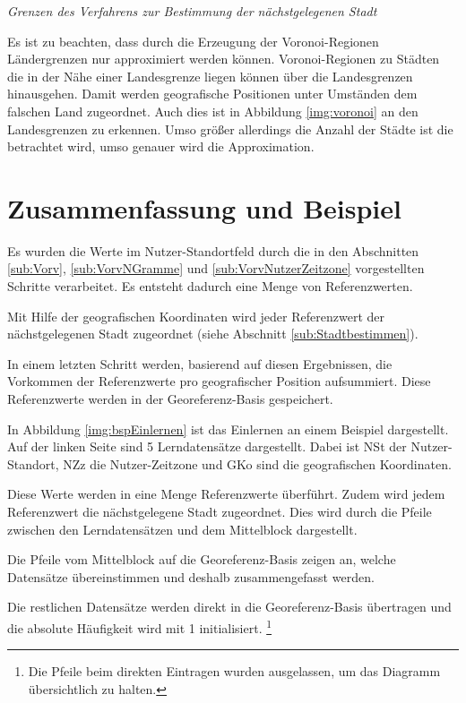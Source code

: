 			\textit{Grenzen des Verfahrens zur Bestimmung der nächstgelegenen Stadt}

				Es ist zu beachten, dass durch die Erzeugung der Voronoi-Regionen Ländergrenzen nur approximiert werden können. 
				Voronoi-Regionen zu Städten die in der Nähe einer Landesgrenze liegen können über die Landesgrenzen hinausgehen. 
				Damit werden geografische Positionen unter Umständen dem falschen Land zugeordnet.
				Auch dies ist in Abbildung \ref{img:voronoi} an den Landesgrenzen zu erkennen. 
				Umso größer allerdings die Anzahl der Städte ist die betrachtet wird, umso genauer wird die Approximation. 

		\section{Zusammenfassung und Beispiel}

			Es wurden die Werte im Nutzer-Standortfeld durch die in den Abschnitten \ref{sub:Vorv}, \ref{sub:VorvNGramme} und \ref{sub:VorvNutzerZeitzone} vorgestellten Schritte verarbeitet.
			Es entsteht dadurch eine Menge von Referenzwerten.
			
			Mit Hilfe der geografischen Koordinaten wird jeder Referenzwert der nächstgelegenen Stadt zugeordnet (siehe Abschnitt \ref{sub:Stadtbestimmen}). 
			
			In einem letzten Schritt werden, basierend auf diesen Ergebnissen, die Vorkommen der Referenzwerte pro geografischer Position aufsummiert.
			Diese Referenzwerte werden in der Georeferenz-Basis gespeichert.

			In Abbildung \ref{img:bspEinlernen} ist das Einlernen an einem Beispiel dargestellt.
			Auf der linken Seite sind 5 Lerndatensätze dargestellt.
			Dabei ist NSt der Nutzer-Standort, NZz die Nutzer-Zeitzone und GKo sind die geografischen Koordinaten.
			
			Diese Werte werden in eine Menge Referenzwerte überführt.
			Zudem wird jedem Referenzwert die nächstgelegene Stadt zugeordnet.
			Dies wird durch die Pfeile zwischen den Lerndatensätzen und dem Mittelblock dargestellt.
			
			Die Pfeile vom Mittelblock auf die Georeferenz-Basis zeigen an, welche Datensätze übereinstimmen und deshalb zusammengefasst werden. 
			
			Die restlichen Datensätze werden direkt in die Georeferenz-Basis übertragen und die absolute Häufigkeit wird mit 1 initialisiert. \footnote{Die Pfeile beim direkten Eintragen wurden ausgelassen, um das Diagramm übersichtlich zu halten.} 
			
